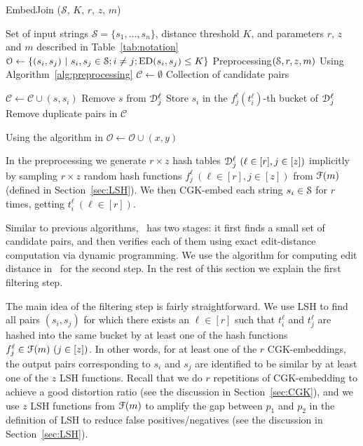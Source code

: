 \begin{algorithm}[t]
\caption{EmbedJoin ($\mathcal{S}$, $K$, $r$, $z$, $m$)}
\label{alg:embed-join}
\begin{algorithmic}[1]
\Require Set of input strings $\mathcal{S} = \{s_1, \ldots, s_n\}$, distance threshold $K$, and parameters $r$, $z$ and $m$ described in Table~\ref{tab:notation}
\Ensure  $\O \gets \{(s_i, s_j)\ |\ s_i, s_j \in \S; i \neq j; \text{ED}(s_i, s_j) \le K\}$ 
\State Preprocessing$(\S, r, z, m)$  
\Comment Using Algorithm~\ref{alg:preprocessing}
\State  $\mathcal{C} \leftarrow \emptyset $  
\Comment Collection of candidate pairs

	\ForEach{$\ell \in [r]$}
				 \label{ln:a-1}
				\State $\mathcal{C}  \leftarrow \mathcal{C}  \cup (s, s_i)$ 
\Else
				\State Remove $s$ from $\D_j^\ell$ \label{ln:a-2}
				\EndIf
			\EndFor
			\State Store $s_i$ in the $f_j^\ell (t_i^\ell)$-th bucket of $\D_j^\ell$
		\EndFor
	\EndFor
	\State Remove duplicate pairs in $\mathcal{C}$ \label{ln:a-3}
\EndFor

	\Comment Using the algorithm in \cite{Ukkonen85}
	\State $\mathcal{O} \leftarrow  \mathcal{O} \cup (x, y)$
	\EndIf
\EndFor
\end{algorithmic}
\end{algorithm}

In the preprocessing we generate $r \times z$ hash tables $\D_j^\ell\ (\ell \in [r], j \in [z])$ implicitly by sampling  $r \times z$ random hash functions $f_j^\ell\ (\ell \in [r], j \in [z])$ from $\F(m)$ (defined in Section~\ref{sec:LSH}).  We then CGK-embed each string $s_i \in \S$ for $r$ times, getting $t_i^\ell\ (\ell \in [r])$.

Similar to previous algorithms, \ebdjoin\ has two stages: it first finds a small set of candidate pairs, and then verifies each of them using exact edit-distance computation via dynamic programming.  We use the algorithm for computing edit distance in~\cite{Ukkonen85} for the second step.  In the rest of this section we explain the first filtering step.

The main idea of the filtering step is fairly straightforward. We use LSH to find all pairs $(s_i, s_j)$ for which there exists an $\ell \in [r]$ such that $t_i^\ell$ and $t_j^\ell$ are hashed into the same bucket by at least one of the hash functions $f_j^\ell \in \F(m)\ (j \in [z])$.  In other words, for at least one of the $r$ CGK-embeddings, the output pairs corresponding to $s_i$ and $s_j$ are identified to be similar by at least one of the $z$ LSH functions.  Recall that we do $r$ repetitions of CGK-embedding to achieve a good distortion ratio (see the discussion in Section~\ref{sec:CGK}), and we use $z$ LSH functions from $\F(m)$ to amplify the gap between $p_1$ and $p_2$ in the definition of LSH to reduce false positives/negatives (see the discussion in Section~\ref{sec:LSH}).

